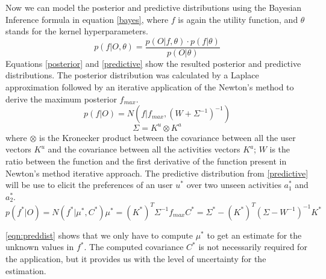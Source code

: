 \documentclass[11pt,a4paper,oneside]{article}
\begin{document}
Now we can model the posterior and predictive distributions using the Bayesian Inference formula in equation \ref{bayes}, where $f$ is again the utility function, and $\theta$ stands for the kernel hyperparameters.
\begin{equation}
    \label{bayes}
    p(f|O, \theta) = \frac{p(O|f,\theta) \cdot p(f|\theta)}{p(O|\theta)} 
\end{equation}
Equations \ref{posterior} and \ref{predictive} show the resulted posterior and predictive distributions. The posterior distribution was calculated by a Laplace approximation followed by an iterative application of the Newton's method to derive the maximum posterior $f_{max}$.
\begin{equation}
    \label{posterior}
    p(f|O) = N(f|f_{max}, (W + \Sigma^{-1})^{-1})
\end{equation}
\begin{equation}
     \Sigma = K^u \otimes K^a
\end{equation}
where $\otimes$ is the Kronecker product between the covariance between all the user vectors $K^u$ and the covariance between all the activities vectors $K^a$; $W$ is the ratio between the function and the first derivative of the function present in Newton's method iterative approach. The predictive distribution from \ref{predictive} will be use to elicit the preferences of an user $u^*$ over two unseen activities $a^*_1$ and $a^*_2$. 
\begin{subequations}
\label{eqn:preddist}
\begin{equation}
    \label{predictive}
    p(f^*|O) = N(f^*|\mu^*, C^*)
\end{equation}
\begin{equation}
    \mu^* = (K^*)^T\Sigma^{-1}f_{max}
\end{equation}
\begin{equation}
    C^* = \Sigma^* - (K^*)^T(\Sigma - W^{-1})^{-1}K^*    
\end{equation}
\end{subequations}

\autoref{eqn:preddist} shows that we only have to compute $\mu^*$ to get an estimate for the unknown values in $f^*$. The computed covariance $C^*$ is not necessarily required for the application, but it provides us with the level of uncertainty for the estimation.
 
\end{document}
